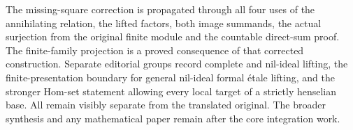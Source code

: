The missing-square correction is propagated through all four uses of the annihilating relation, the lifted factors, both image summands, the actual surjection from the original finite module and the countable direct-sum proof. The finite-family projection is a proved consequence of that corrected construction. Separate editorial groups record complete and nil-ideal lifting, the finite-presentation boundary for general nil-ideal formal étale lifting, and the stronger Hom-set statement allowing every local target of a strictly henselian base. All remain visibly separate from the translated original. The broader synthesis and any mathematical paper remain after the core integration work.
